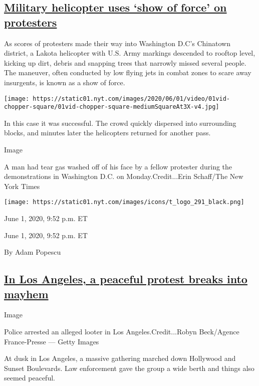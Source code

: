 \hypertarget{military-helicopter-uses-show-of-force-on-protesters}{%
\subsection{\texorpdfstring{\protect\hyperlink{military-helicopter-uses-show-of-force-on-protesters}{Military
helicopter uses `show of force' on
protesters}}{Military helicopter uses `show of force' on protesters}}\label{military-helicopter-uses-show-of-force-on-protesters}}

As scores of protesters made their way into Washington D.C's Chinatown
district, a Lakota helicopter with U.S. Army markings descended to
rooftop level, kicking up dirt, debris and snapping trees that narrowly
missed several people. The maneuver, often conducted by low flying jets
in combat zones to scare away insurgents, is known as a show of force.

\texttt{[image: https://static01.nyt.com/images/2020/06/01/video/01vid-chopper-square/01vid-chopper-square-mediumSquareAt3X-v4.jpg]}

In this case it was successful. The crowd quickly dispersed into
surrounding blocks, and minutes later the helicopters returned for
another pass.

Image

A man had tear gas washed off of his face by a fellow protester during
the demonstrations in Washington D.C. on Monday.Credit...Erin Schaff/The
New York Times

\texttt{[image: https://static01.nyt.com/images/icons/t\_logo\_291\_black.png]}

June 1, 2020, 9:52 p.m. ET

June 1, 2020, 9:52 p.m. ET

By Adam Popescu

\hypertarget{in-los-angeles-a-peaceful-protest-breaks-into-mayhem}{%
\subsection{\texorpdfstring{\protect\hyperlink{in-los-angeles-a-peaceful-protest-breaks-into-mayhem}{In
Los Angeles, a peaceful protest breaks into
mayhem}}{In Los Angeles, a peaceful protest breaks into mayhem}}\label{in-los-angeles-a-peaceful-protest-breaks-into-mayhem}}

Image

Police arrested an alleged looter in Los Angeles.Credit...Robyn
Beck/Agence France-Presse --- Getty Images

At dusk in Los Angeles, a massive gathering marched down Hollywood and
Sunset Boulevards. Law enforcement gave the group a wide berth and
things also seemed peaceful.

